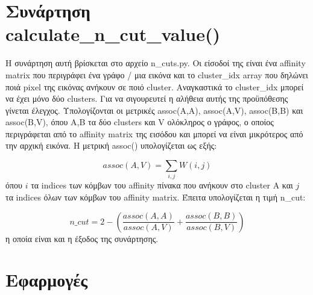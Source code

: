 \documentclass{article}
\begin{document}
\section{Συνάρτηση calculate\_n\_cut\_value()}
Η συνάρτηση αυτή βρίσκεται στο αρχείο n\_cuts.py. Οι είσοδοί της είναι ένα 
affinity matrix που περιγράφει ένα γράφο / μια εικόνα και το cluster\_idx array 
που δηλώνει ποιά pixel της εικόνας ανήκουν σε ποιό cluster. Αναγκαστικά το
cluster\_idx μπορεί να έχει μόνο δύο clusters. Για να σιγουρευτεί η
αλήθεια αυτής της προϋπόθεσης γίνεται έλεγχος. Υπολογίζονται οι 
μετρικές assoc(A,A), assoc(A,V), assoc(B,B) και assoc(B,V), όπου A,B τα δύο
clusters και V ολόκληρος ο γράφος, ο οποίος περιγράφεται από το affinity
matrix της εισόδου και μπορεί να είναι μικρότερος από την αρχική εικόνα. 
Η μετρική assoc() υπολογίζεται ως εξής:

\begin{equation}
    assoc(A,V) = \sum_{i, j} W(i, j)
\end{equation}
όπου $i$ τα indices των κόμβων του affinity πίνακα που ανήκουν στο cluster A
και $j$ τα indices όλων των κόμβων του affinity matrix. Έπειτα υπολογίζεται η 
τιμή n\_cut:

\begin{equation}
    n\_cut = 2 - \left(\frac{assoc(A,A)}{assoc(A,V)} + \frac{assoc(B,B)}{assoc(B,V)}\right)
\end{equation}
η οποία είναι και η έξοδος της συνάρτησης.

\section{Εφαρμογές}
\end{document}
